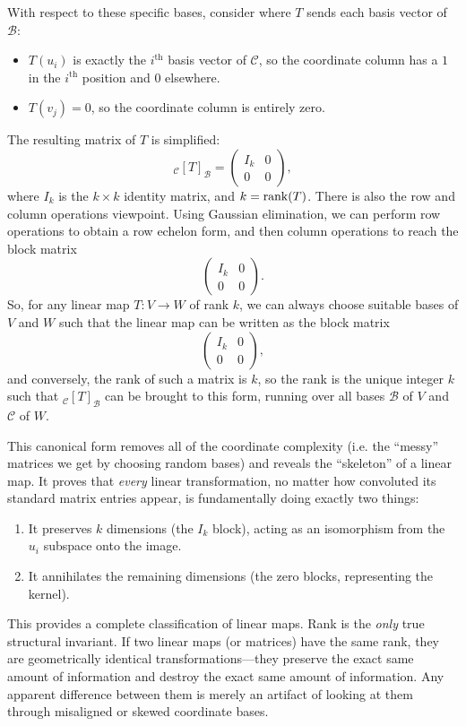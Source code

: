 \documentclass[../linear_algebra_and_groups.tex]{subfiles}
\begin{document}
With respect to these specific bases, consider where $T$ sends each basis vector of $\mathcal{B}$:
\begin{itemize}
    \item $T(u_i)$ is exactly the $i^{\mathrm{th}}$ basis vector of $\mathcal{C}$, so the coordinate column has a $1$ in the $i^{\mathrm{th}}$ position and $0$ elsewhere.
    \item $T(v_j) = 0$, so the coordinate column is entirely zero.
\end{itemize}

The resulting matrix of $T$ is simplified:
\[ {}_\mathcal{C}[T]_\mathcal{B} = \begin{pmatrix} I_k & 0 \\ 0 & 0 \end{pmatrix}, \]
where $I_k$ is the $k \times k$ identity matrix, and $k = \operatorname{rank}(T)$.
There is also the row and column operations viewpoint. Using Gaussian elimination, we can perform row operations to obtain a row echelon form, and then column operations to reach the block matrix \[\begin{pmatrix}I_k & 0 \\ 0 & 0\end{pmatrix}.\]
So, for any linear map $T:V\to W$ of rank $k$, we can always choose suitable bases of $V$ and $W$ such that the linear map can be written as the block matrix $$\begin{pmatrix}I_k & 0 \\ 0 & 0\end{pmatrix},$$and conversely, the rank of such a matrix is $k$, so the rank is the unique integer $k$ such that ${}_\mathcal{C}[T]_\mathcal{B}$ can be brought to this form, running over all bases $\mathcal{B}$ of $V$ and $\mathcal{C}$ of $W$.
\begin{remark}
    This canonical form removes all of the coordinate complexity (i.e. the ``messy'' matrices we get by choosing random bases) and reveals the ``skeleton'' of a linear map. It proves that \textit{every} linear transformation, no matter how convoluted its standard matrix entries appear, is fundamentally doing exactly two things:
    \begin{enumerate}
        \item It preserves $k$ dimensions (the $I_k$ block), acting as an isomorphism from the $u_i$ subspace onto the image.
        \item It annihilates the remaining dimensions (the zero blocks, representing the kernel).
    \end{enumerate}
    This provides a complete classification of linear maps. Rank is the \textit{only} true structural invariant. If two linear maps (or matrices) have the same rank, they are geometrically identical transformations—they preserve the exact same amount of information and destroy the exact same amount of information. Any apparent difference between them is merely an artifact of looking at them through misaligned or skewed coordinate bases.
\end{remark}
\end{document}
